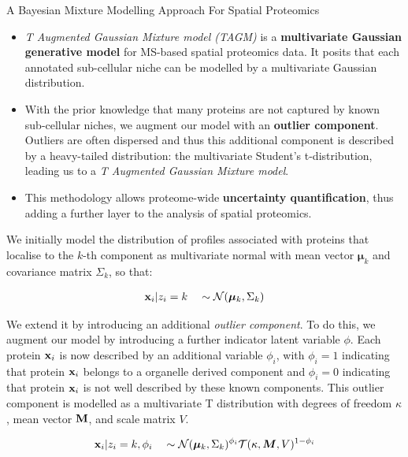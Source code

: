 \begin{frame}{A Bayesian Mixture Modelling Approach For Spatial Proteomics}

  \begin{itemize}

    \item<+-> \textit{T Augmented Gaussian Mixture model (TAGM)} is a
      \textbf{multivariate Gaussian generative model} for MS-based
      spatial proteomics data. It posits that each annotated
      sub-cellular niche can be modelled by a multivariate Gaussian
      distribution.

    \item<+-> With the prior knowledge that many proteins are not
      captured by known sub-cellular niches, we augment our model with
      an \textbf{outlier component}. Outliers are often dispersed and
      thus this additional component is described by a heavy-tailed
      distribution: the multivariate Student's t-distribution, leading
      us to a \textit{T Augmented Gaussian Mixture model}.

    \item<+-> This methodology allows proteome-wide
      \textbf{uncertainty quantification}, thus adding a further layer
      to the analysis of spatial proteomics.

  \end{itemize}
\end{frame}


\begin{frame}{}

    We initially model the distribution of profiles associated with
    proteins that localise to the $k$-th component as multivariate
    normal with mean vector $\boldsymbol{\mu}_k$ and covariance matrix
    $\Sigma_k$, so that:

    \begin{align}
      {\bf x}_i | z_i = k \quad \sim \mathcal{N}(\boldsymbol{\mu}_k, \Sigma_k) \label{equation::preq}
    \end{align}

    \pause

    We extend it by introducing an additional \textit{outlier
      component}. To do this, we augment our model by introducing a
    further indicator latent variable $\phi$. Each protein ${\bf x}_i$
    is now described by an additional variable $\phi_i$, with $\phi_i
    = 1$ indicating that protein ${\bf x}_i$ belongs to a organelle
    derived component and $\phi_i = 0$ indicating that protein ${\bf
      x}_i$ is not well described by these known components. This
    outlier component is modelled as a multivariate T distribution
    with degrees of freedom $\kappa$, mean vector $\bf{M}$, and scale
    matrix $V$.

    \begin{align}
      {\bf x}_i | z_i = k, \phi_i \quad \sim \mathcal{N}(\boldsymbol{\mu}_k, \Sigma_k)^{\phi_i}\mathcal{T}(\kappa, \boldsymbol{M}, V)^{1 - \phi_i }
    \end{align}


\end{frame}


